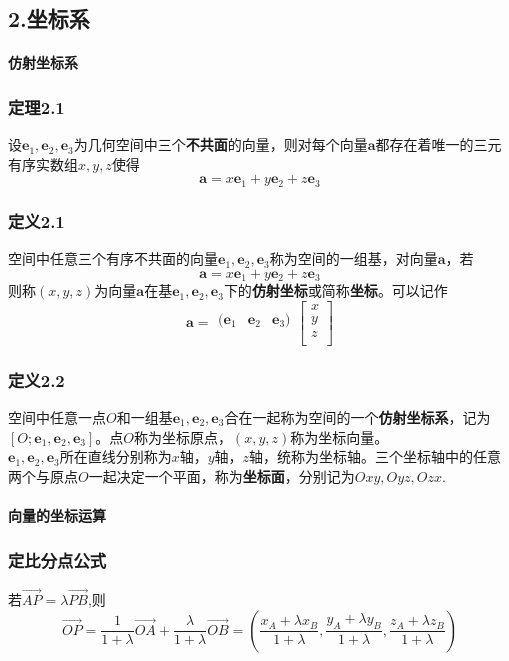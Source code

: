 \documentclass{article}
\newcommand{\ve}{\boldsymbol}
\begin{document}
\begin{CJK}{UTF8}{gkai}
\subsection*{2.坐标系}
\paragraph{仿射坐标系\\}
\subsubsection*{定理2.1}
设$\ve{e}_1,\ve{e}_2,\ve{e}_3$为几何空间中三个\textbf{不共面}的向量，则对每个向量$\ve{a}$都存在着唯一的三元有序实数组$x,y,z$使得
\[\ve{a}=x\ve{e}_1+y\ve{e}_2+z\ve{e}_3\]
\subsubsection*{定义2.1}
空间中任意三个有序不共面的向量$\ve{e}_1,\ve{e}_2,\ve{e}_3$称为空间的一组基，对向量$\ve{a}$，若
\[\ve{a}=x\ve{e}_1+y\ve{e}_2+z\ve{e}_3\]
则称$(x,y,z)$为向量$\ve{a}$在基$\ve{e}_1,\ve{e}_2,\ve{e}_3$下的\textbf{仿射坐标}或简称\textbf{坐标}。可以记作\\
\[\ve{a}=
\begin{matrix}
    (\ve{e}_1&\ve{e}_2&\ve{e}_3)\\
\end{matrix}
\begin{bmatrix}
x\\
y\\
z\\
\end{bmatrix}
\]
\subsubsection*{定义2.2}
空间中任意一点$O$和一组基$\ve{e}_1,\ve{e}_2,\ve{e}_3$合在一起称为空间的一个\textbf{仿射坐标系}，记为$[O;\ve{e}_1,\ve{e}_2,\ve{e}_3]$。点$O$称为坐标原点，$(x,y,z)$称为坐标向量。\\
$\ve{e}_1,\ve{e}_2,\ve{e}_3$所在直线分别称为$x$轴，$y$轴，$z$轴，统称为坐标轴。三个坐标轴中的任意两个与原点$O$一起决定一个平面，称为\textbf{坐标面}，分别记为$Oxy,Oyz,Ozx$.
\paragraph{向量的坐标运算}
\subsubsection*{定比分点公式}
若$\overrightarrow{AP}=\lambda\overrightarrow{PB}$,则
\[\overrightarrow{OP}=\dfrac{1}{1+\lambda}\overrightarrow{OA}+\dfrac{\lambda}{1+\lambda}\overrightarrow{OB}=(\dfrac{x_A+\lambda x_B}{1+\lambda},\dfrac{y_A+\lambda y_B}{1+\lambda},\dfrac{z_A+\lambda z_B}{1+\lambda})\]


\end{CJK}
\end{document}
